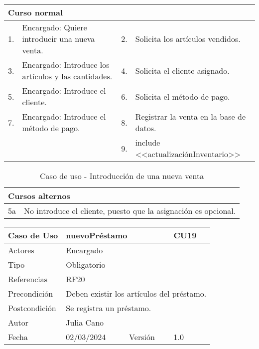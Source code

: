 \begin{table}[H]
	\centering
	\begin{tabular}{| m{} | m{} | m{} | m{} |}
		\hline
		\multicolumn{4}{|m{0.9\textwidth}|}{Curso normal}     \\ 
		\hline
		1. & Encargado: Quiere introducir una nueva venta. & 2. &  Solicita los artículos vendidos.  \\ 
		\hline
		3. & Encargado: Introduce los artículos y las cantidades. & 4. &  Solicita el cliente asignado.  \\ 
		\hline
		5. & Encargado: Introduce el cliente. & 6. & Solicita el método de pago.  \\ 
		\hline
		7. & Encargado: Introduce el método de pago. & 8. & Registrar la venta en la base de datos.  \\ 
		\hline
		&  & 9. &  include <<actualizaciónInventario>>  \\ 
		\hline
	\end{tabular}
\end{table}

\begin{table}[H]
	\centering
	\begin{tabular}{| m{} | m{} | m{} | m{} |}
		\hline
		\multicolumn{4}{|m{0.9\textwidth}|}{Cursos alternos}     \\ 
		\hline
		5a & \multicolumn{3}{m{0.67\textwidth}|}{No introduce el cliente, puesto que la asignación es opcional.} \\ 
		\hline
	\end{tabular}
	\caption{Caso de uso - Introducción de una nueva venta}
\end{table}

\newpage


\begin{table}[H]
	\centering
	\begin{tabular}{| m{} | m{} | m{} | m{}|}
		\hline
		\rowcolor{grayshade} Caso de Uso & \multicolumn{2}{|m{0.43\textwidth}|}{nuevoPréstamo} &  CU19\\ 
		\hline
		Actores & \multicolumn{3}{l|}{Encargado} \\ 
		\hline
		Tipo & \multicolumn{3}{l|}{Obligatorio} \\ 
		\hline
		Referencias & \multicolumn{3}{l|}{RF20} \\ 
		\hline
		Precondición & \multicolumn{3}{m{0.67\textwidth}|}{Deben existir los artículos del préstamo.} \\ 
		\hline
		Postcondición & \multicolumn{3}{m{0.67\textwidth}|}{Se registra un préstamo.} \\ 
		\hline
		Autor & \multicolumn{3}{l|}{Julia Cano} \\ 
		\hline
		Fecha & 02/03/2024 & Versión & 1.0 \\
		\hline
	\end{tabular}
\end{table}

